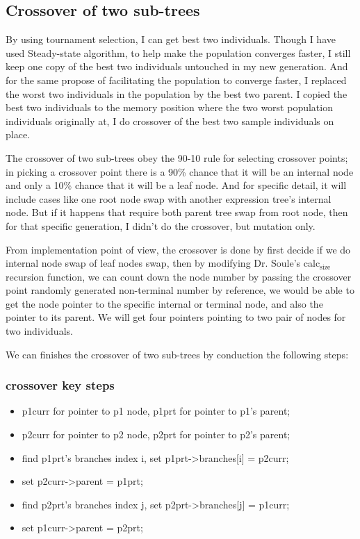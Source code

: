 \documentclass[10pt,b5paper]{article}
\begin{document}
\subsection{Crossover of two sub-trees}
\label{sec-1-2}
By using tournament selection, I can get best two individuals. Though I have used Steady-state algorithm, to help make the population converges faster, I still keep one copy of the best two individuals untouched in my new generation. And for the same propose of facilitating the population to converge faster, I replaced the worst two individuals in the population by the best two parent. I copied the best two individuals to the memory position where the two worst population individuals originally at, I do crossover of the best two sample individuals on place.

The crossover of two sub-trees obey the 90-10 rule for selecting crossover points; in picking a crossover point there is a 90\% chance that it will be an internal node and only a 10\% chance that it will be a leaf node. And for specific detail, it will include cases like one root node swap with another expression tree's internal node. But if it happens that require both parent tree swap from root node, then for that specific generation, I didn't do the crossover, but mutation only. 

From implementation point of view, the crossover is done by first decide if we do internal node swap of leaf nodes swap, then by modifying Dr. Soule's calc$_{\text{size}}$ recursion function, we can count down the node number by passing the crossover point randomly generated non-terminal number by reference, we would be able to get the node pointer to the specific internal or terminal node, and also the pointer to its parent. We will get four pointers pointing to two pair of nodes for two individuals. 

We can finishes the crossover of two sub-trees by conduction the following steps: 
\subsubsection{crossover key steps}
\label{sec-1-2-1}
\begin{itemize}
\item p1curr for pointer to p1 node, p1prt for pointer to p1's parent;
\item p2curr for pointer to p2 node, p2prt for pointer to p2's parent;
\item find p1prt's branches index i, set p1prt->branches[i] = p2curr;
\item set p2curr->parent = p1prt;
\item find p2prt's branches index j, set p2prt->branches[j] = p1curr;
\item set p1curr->parent = p2prt;
\end{itemize}
\end{document}
